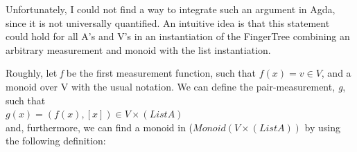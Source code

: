 \documentclass[12pt,twoside,notitlepage]{report}
\begin{document}
Unfortunately, I could not find a way to integrate such an argument in Agda, since it is not universally quantified. An intuitive idea is that this statement could hold for all A's and V's in an instantiation of the FingerTree combining an arbitrary measurement and monoid with the list instantiation. 

Roughly, let \textit{f} be the first measurement function, such that $f(x) = v \in V$, and a monoid over V with the usual notation. 
We can define the pair-measurement, \textit{g}, such that \\ 
\indent\indent $g(x) =  (f(x) , [ x ]) \in V \times (List A)$\\
and, furthermore, we can find a monoid in ($Monoid (V \times (List A))$ by using the following definition: 

\begin{code}
\\
\>[0]\<[2]%
\>[2] \AgdaSymbol{:}  \AgdaSymbol{\{}\AgdaSymbol{\}} \AgdaSymbol{\{} \AgdaSymbol{:}  \AgdaSymbol{\}} \AgdaSymbol{\{} \AgdaSymbol{:}  \AgdaSymbol{\}}\<%
\\
\>[2]\<[16]%
\>[16]  \<%
\\
\>[2]\<[16]%
\>[16]  \<%
\\
\>[2]\<[16]%
\>[16]  \AgdaSymbol{(}  \AgdaSymbol{)}\<%
\\
\>[0]\<[2]%
\>[2]   \AgdaSymbol{=} \<%
\\
\>[2]\<[4]%
\>[4]\AgdaSymbol{(} \AgdaInductiveConstructor{,} \AgdaSymbol{)} \<[16]%
\>[16]\<%
\\
\>[2]\<[4]%
\>[4]        \AgdaSymbol{)} \<[37]%
\>[37]\\\<%
\>%
\\
\>[0]\<[4]%
\>[4]\<%
\\
\>[4]\<[6]%
\>[6] \AgdaSymbol{=}  \<%
\\
\>[4]\<[6]%
\>[6] \AgdaSymbol{=}  \<%
\\
\>[4]\<[6]%
\>[6] \AgdaSymbol{=}  \<%
\\
\>[4]\<[6]%
\>[6] \AgdaSymbol{=}  \<%
\\
\end{code}
\end{document}
